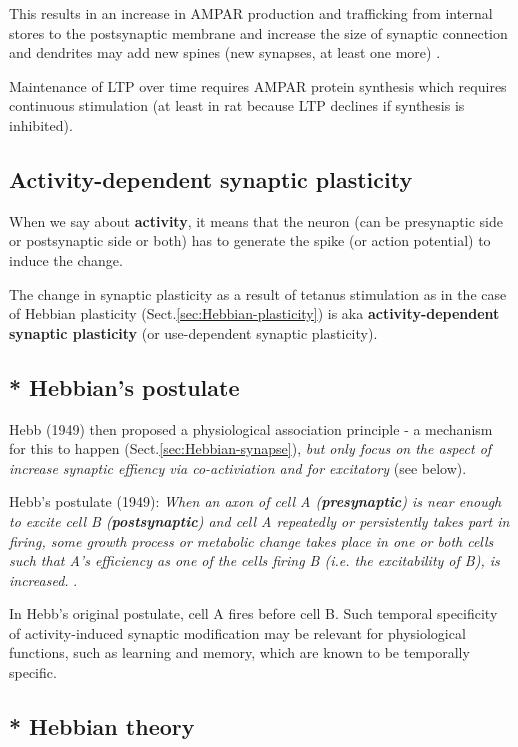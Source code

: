   This results in an increase in AMPAR production and trafficking from internal
  stores to the postsynaptic membrane and increase the size of synaptic
  connection and dendrites may add new spines (new synapses, at least one more)
  \citep{toni1999}.
  
  Maintenance of LTP over time requires AMPAR protein synthesis which
  requires continuous stimulation (at least in rat because LTP declines if
  synthesis is inhibited).

\subsection{Activity-dependent synaptic plasticity}
\label{sec:activity-dependent-synaptic-plasticity}


When we say about {\bf activity}, it means that the neuron (can be presynaptic
side or postsynaptic side or both) has to generate the spike (or action potential) to
induce the change.

The change in synaptic plasticity as a result of tetanus stimulation as in the
case of Hebbian plasticity (Sect.\ref{sec:Hebbian-plasticity}) is aka
{\bf activity-dependent synaptic plasticity} (or use-dependent synaptic
plasticity).


\subsection{ * Hebbian's postulate}

Hebb (1949) then proposed a physiological association principle -  a mechanism
for this to happen (Sect.\ref{sec:Hebbian-synapse}), {\it but only focus on the
aspect of increase synaptic effiency via co-activiation and for excitatory} (see below).

Hebb's postulate (1949): {\it When an axon of cell A ({\bf presynaptic}) is near
enough to excite cell B ({\bf postsynaptic}) and cell A repeatedly or
persistently takes part in firing, some growth process or metabolic change
takes place in one or both cells such that A's efficiency as one of the cells
firing B (i.e. the excitability of B), is increased.
}. 

In Hebb's original postulate, cell A fires before cell B.
Such temporal specificity of activity-induced synaptic modification may be
relevant for physiological functions, such as learning and memory, which are
known to be temporally specific.

\subsection{ * Hebbian theory}
\label{sec:Hebbian-theory}

